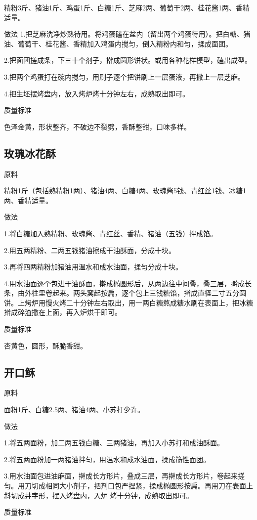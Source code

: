 \documentclass{ctexbook}
\begin{document}
精粉3斤、猪油1斤、鸡蛋1斤、白糖1斤、芝麻2两、葡萄干2两、桂花酱1两、香精适量。

做法
1.把芝麻洗净炒熟待用。将鸡蛋磕在盆内（留出两个鸡蛋待用）。把白糖、猪油、葡萄干、桂花酱、香精加入鸡蛋内搅匀，倒入精粉内和匀，揉成面团。

2.把面团搓成条，下三十个剂子，擀成圆形饼状。或用各种花样模型，磕出成型。

3.把两个鸡蛋打在碗内搅匀，用刷子逐个把饼刷上一层蛋液，再撒上一层芝麻。

4.把生坯摆烤盘内，放入烤炉烤十分钟左右，成熟取出即可。

质量标准

色泽金黄，形状整齐，不破边不裂劈，香酥整甜，口味多样。
\subsection{玫瑰冰花酥}
原料

精粉1斤（包括熟精粉1两）、猪油4两、白糖4两、玫瑰酱5钱、青红丝1钱、冰糖1两、香精适量。

做法

1.将白糖加入熟精粉、玫瑰酱、青红丝、香精、猪油（五钱）拌成馅。

2.用五两精粉、二两五钱猪油擦成干油酥面，分成十块。

3.再将四两精粉加猪油用温水和成水油面，揉匀分成十块。

4.用水油面逐个包进干油酥面，擀成椭圆形后，从两边往中间叠，叠三层，擀成长条，由外往里卷起来。两头窝起按扁，逐个包上三钱糖馅，擀成直径二寸五分圆饼。上烤炉用慢火烤二十分钟左右取出，用一两白糖熬成糖水刷在表面上，把冰糖擀成碎渣撒在上面，再入炉烘干即可。

质量标准

杏黄色，圆形，酥脆香甜。
\subsection{开口稣}
原料

面粉1斤、白糖2.5两、猪油4两、小苏打少许。

做法

1.将五两面粉，加二两五钱白糖、三两猪油，再加入小苏打和成油酥面。

2.将五两面粉加一两猪油拌匀，用温水和成水油面，揉成筋性面团。

3.用水油面包进油麻面，擀成长方形片，叠成三层，再擀成长方形片，卷起来搓匀。用刀切成相同大小剂子，把剂口包严捏紧，揉成椭圆形按扁。再用刀在表面上斜切成井字形，摆入烤盘内，入炉
烤十分钟，成熟取出即可。

质量标准
\end{document}
